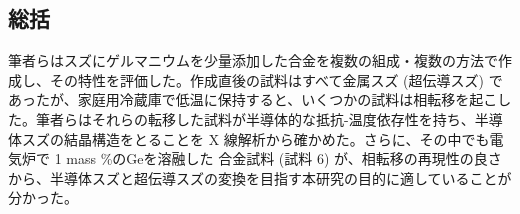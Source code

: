 \subsection{総括}
筆者らはスズにゲルマニウムを少量添加した合金を複数の組成・複数の方法で作成し、その特性を評価した。作成直後の試料はすべて金属スズ (超伝導スズ) であったが、家庭用冷蔵庫で低温に保持すると、いくつかの試料は相転移を起こした。筆者らはそれらの転移した試料が半導体的な抵抗-温度依存性を持ち、半導体スズの結晶構造をとることを X 線解析から確かめた。さらに、その中でも電気炉で 1 mass \%のGeを溶融した 合金試料 (試料 6) が、相転移の再現性の良さから、半導体スズと超伝導スズの変換を目指す本研究の目的に適していることが分かった。

\clearpage


